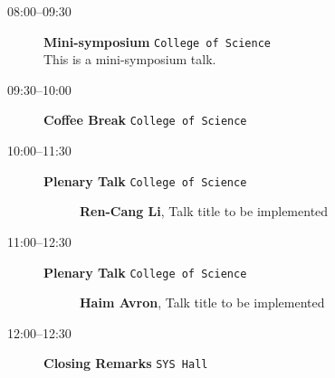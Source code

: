 \documentclass[ILAS2025-program.tex]{subfiles}
\begin{document}
    \begin{description}
    \item[08:00--09:30] \textbf{Mini-symposium} {\footnotesize\texttt{College of Science}}
    \\This is a mini-symposium talk.\item[09:30--10:00] \textbf{Coffee Break} {\footnotesize\texttt{College of Science}}
    \item[10:00--11:30] \textbf{Plenary Talk} {\footnotesize\texttt{College of Science}}
    \begin{description}
        \item[] \textbf{Ren-Cang Li}, Talk title to be implemented
        \end{description}
        \item[11:00--12:30] \textbf{Plenary Talk} {\footnotesize\texttt{College of Science}}
    \begin{description}
        \item[] \textbf{Haim Avron}, Talk title to be implemented
        \end{description}
        \item[12:00--12:30] \textbf{Closing Remarks} {\footnotesize\texttt{SYS Hall}}
    \end{description}
    \newpage
\end{document}
